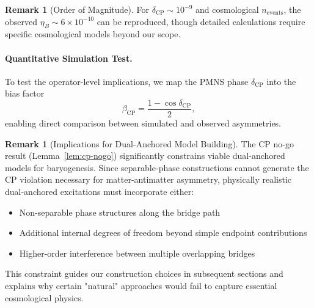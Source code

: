 \documentclass[11pt]{article}
\theoremstyle{plain}
\theoremstyle{definition}
\newtheorem{remark}[theorem]{Remark}
\begin{document}
\begin{remark}[Order of Magnitude]
  For $\delta_{\text{CP}} \sim 10^{-9}$ and cosmological $n_{\text{events}}$, the observed $\eta_B \sim 6\times 10^{-10}$ can be reproduced, though detailed calculations require specific cosmological models beyond our scope.
\end{remark}

\paragraph{Quantitative Simulation Test.}
To test the operator-level implications, we map the PMNS phase $\delta_{\mathrm{CP}}$ into the bias factor
\[
  \beta_{\mathrm{CP}} = \frac{1 - \cos \delta_{\mathrm{CP}}}{2},
\]
enabling direct comparison between simulated and observed asymmetries.

\begin{remark}[Implications for Dual-Anchored Model Building]
  The CP no-go result (Lemma~\ref{lem:cp-nogo}) significantly constrains viable dual-anchored
  models for baryogenesis. Since separable-phase constructions cannot generate the CP violation
  necessary for matter-antimatter asymmetry, physically realistic dual-anchored excitations must
  incorporate either:
  \begin{itemize}
    \item Non-separable phase structures along the bridge path
    \item Additional internal degrees of freedom beyond simple endpoint contributions
    \item Higher-order interference between multiple overlapping bridges
  \end{itemize}
  This constraint guides our construction choices in subsequent sections and explains why
  certain "natural" approaches would fail to capture essential cosmological physics.
\end{remark}
\end{document}
